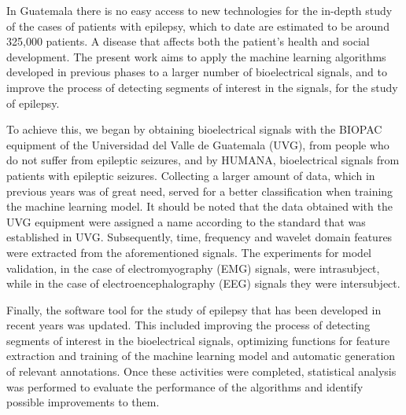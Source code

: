 In Guatemala there is no easy access to new technologies for the in-depth study of the cases of patients with epilepsy, which to date are estimated to be around 325,000 patients. A disease that affects both the patient's health and social development. 
The present work aims to apply the machine learning algorithms developed in previous phases to a larger number of bioelectrical signals, and to improve the process of detecting segments of interest in the signals, for the study of epilepsy.

To achieve this, we began by obtaining bioelectrical signals with the BIOPAC equipment of the Universidad del Valle de Guatemala (UVG), from people who do not suffer from epileptic seizures, and by HUMANA, bioelectrical signals from patients with epileptic seizures.
Collecting a larger amount of data, which in previous years was of great need, served for a better classification when training the machine learning model. It should be noted that the data obtained with the UVG equipment were assigned a name according to the standard that was established in UVG. Subsequently, time, frequency and wavelet domain features were extracted from the aforementioned signals. The experiments for model validation, in the case of electromyography (EMG) signals, were intrasubject, while in the case of electroencephalography (EEG) signals they were intersubject. 

Finally, the software tool for the study of epilepsy that has been developed in recent years was updated. This included improving the process of detecting segments of interest in the bioelectrical signals, optimizing functions for feature extraction and training of the machine learning model and automatic generation of relevant annotations. Once these activities were completed, statistical analysis was performed to evaluate the performance of the algorithms and identify possible improvements to them.